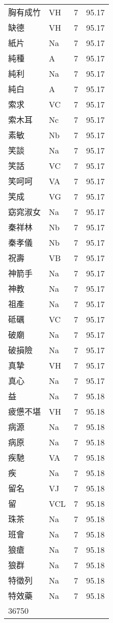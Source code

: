 \documentclass[twocolumn]{book}
\begin{document}
\begin{supertabular}{llrr}
胸有成竹 & VH & 7 &  95.17\\
缺德 & VH & 7 &  95.17\\
紙片 & Na & 7 &  95.17\\
純種 & A & 7 &  95.17\\
純利 & Na & 7 &  95.17\\
純白 & A & 7 &  95.17\\
索求 & VC & 7 &  95.17\\
索木耳 & Nc & 7 &  95.17\\
素敏 & Nb & 7 &  95.17\\
笑談 & Na & 7 &  95.17\\
笑話 & VC & 7 &  95.17\\
笑呵呵 & VA & 7 &  95.17\\
笑成 & VG & 7 &  95.17\\
窈窕淑女 & Na & 7 &  95.17\\
秦祥林 & Nb & 7 &  95.17\\
秦孝儀 & Nb & 7 &  95.17\\
祝壽 & VB & 7 &  95.17\\
神箭手 & Na & 7 &  95.17\\
神教 & Na & 7 &  95.17\\
祖產 & Na & 7 &  95.17\\
砥礪 & VC & 7 &  95.17\\
破廟 & Na & 7 &  95.17\\
破損險 & Na & 7 &  95.17\\
真摯 & VH & 7 &  95.17\\
真心 & Na & 7 &  95.17\\
益 & Na & 7 &  95.18\\
疲憊不堪 & VH & 7 &  95.18\\
病源 & Na & 7 &  95.18\\
病原 & Na & 7 &  95.18\\
疾馳 & VA & 7 &  95.18\\
疾 & Na & 7 &  95.18\\
留名 & VJ & 7 &  95.18\\
留 & VCL & 7 &  95.18\\
珠茶 & Na & 7 &  95.18\\
班會 & Na & 7 &  95.18\\
狼瘡 & Na & 7 &  95.18\\
狼群 & Na & 7 &  95.18\\
特徵列 & Na & 7 &  95.18\\
特效藥 & Na & 7 &  95.18\\
36750\\

\end{supertabular}
\end{document}
